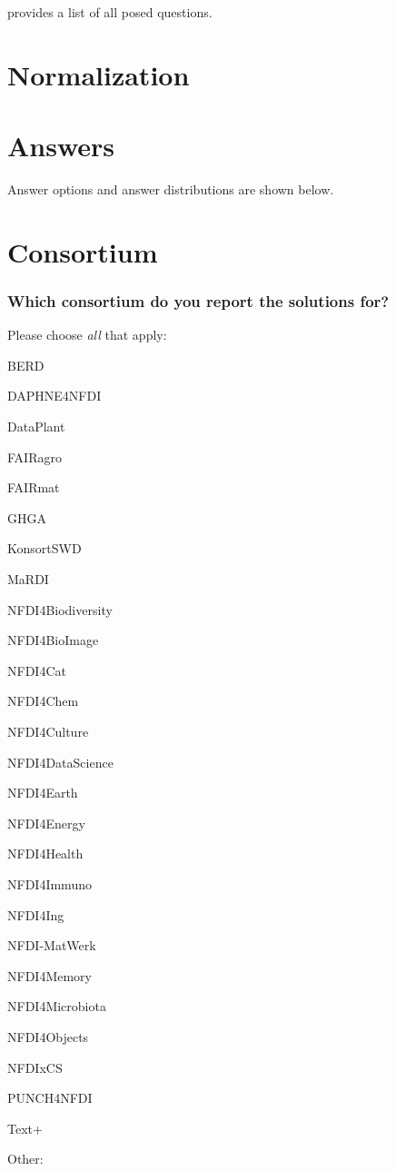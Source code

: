 \documentclass[headsepline,titlepage,twoside,12pt,toc=flat,headings=normal]{scrreprt}
\newcommand{\question}[1]{\subsubsection{#1}}
\newcommand{\otherbox}{\fbox{\phantom{This is how big an answer would be.}}}
\begin{document}
 provides a list of all posed questions.

\section{Normalization}

\section{Answers}
Answer options and answer distributions are shown below.


\section{Consortium}

\question{Which consortium do you report the solutions for?}

Please choose \emph{all} that apply:

\begin{answers}
\item \acs{BERD}
\item DAPHNE4NFDI
\item DataPlant
\item \acs{FAIRagro}
\item \acs{FAIRmat}
\item \acs{GHGA}
\item KonsortSWD
\item \acs{MaRDI}
\item NFDI4Biodiversity
\item NFDI4BioImage
\item NFDI4Cat
\item NFDI4Chem
\item NFDI4Culture
\item NFDI4DataScience
\item NFDI4Earth
\item NFDI4Energy
\item NFDI4Health
\item NFDI4Immuno
\item NFDI4Ing
\item NFDI-MatWerk
\item NFDI4Memory
\item NFDI4Microbiota
\item NFDI4Objects
\item NFDIxCS
\item \acs{PUNCH}4NFDI
\item Text+
\item Other: \otherbox
\end{answers}
\end{document}
